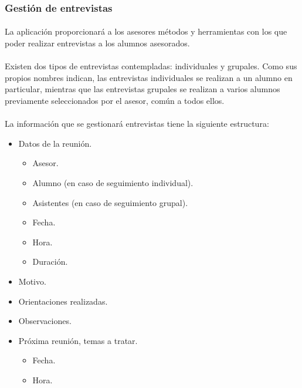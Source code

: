       \subsubsection{Gestión de entrevistas}

      \paragraph{}La aplicación proporcionará a los asesores métodos y
      herramientas con los que poder realizar entrevistas a los alumnos
      asesorados.

      \paragraph{}Existen dos tipos de entrevistas contempladas: individuales y
      grupales. Como sus propios nombres indican, las entrevistas individuales
      se realizan a un alumno en particular, mientras que las entrevistas
      grupales se realizan a varios alumnos previamente seleccionados por el
      asesor, común a todos ellos.

      \paragraph{}La información que se gestionará entrevistas tiene la
      siguiente estructura:

      \begin{itemize}
         \item Datos de la reunión.
         \begin{itemize}
            \item Asesor.
            \item Alumno (en caso de seguimiento individual).
            \item Asistentes (en caso de seguimiento grupal).
            \item Fecha.
            \item Hora.
            \item Duración.
         \end{itemize}
         \item Motivo.
         \item Orientaciones realizadas.
         \item Observaciones.
         \item Próxima reunión, temas a tratar.
         \begin{itemize}
            \item Fecha.
            \item Hora.
         \end{itemize}
      \end{itemize}

